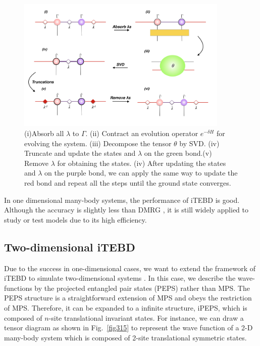 \begin{figure}[ht]
	\centering
	\includegraphics[width=0.90\textwidth]{figures/fig313.png}
	\caption[The tensor network diagrams for the 1-D iTEBD]{ (i)Absorb all $\lambda$ to $\Gamma$. (ii) Contract an evolution operator $e^{-\delta H}$ for evolving the system. (iii) Decompose the tensor $\theta$ by SVD. (iv) Truncate and update the states and $\lambda$ on the green bond.(v) Remove $
		\lambda$ for obtaining the states. (iv) After updating the states and $\lambda$ on the purple bond, we can apply the same way to update the red bond and repeat all the steps until the ground state converges.}
	\label{fig314}
\end{figure}

In one dimensional many-body systems, the performance of iTEBD is good. Although the accuracy is slightly less than DMRG \cite{PhysRevB.48.10345}, it is still widely applied to study or test models due to its high efficiency.

\subsection{Two-dimensional iTEBD}
\label{2ditebd}

Due to the success in one-dimensional cases, we want to extend the framework of iTEBD to simulate two-dimensional systems . In this case, we describe the wave-functions by the projected entangled pair states (PEPS) rather than MPS. 
The PEPS structure is a straightforward extension of MPS and obeys the restriction of MPS. Therefore, it can be expanded to a infinite structure, iPEPS, which is composed of $n$-site translational invariant states. For instance, we can draw a tensor diagram as shown in Fig.~\ref{fig315} to represent the wave function of a 2-D many-body system which is composed of 2-site translational symmetric states.

